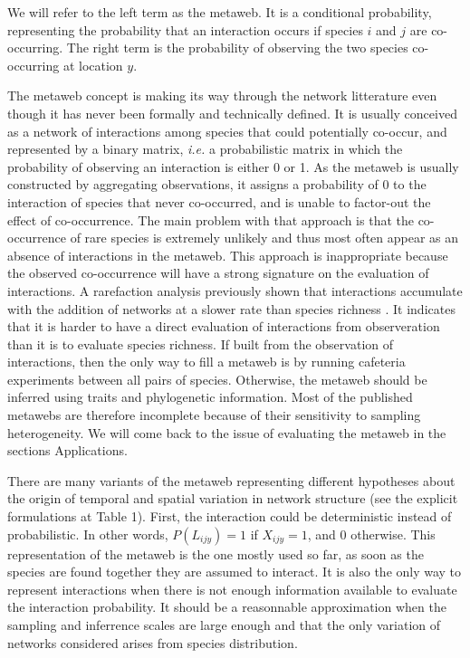 \documentclass[12pt]{article}
\begin{document}
We will refer to the left term as the metaweb. It is a conditional probability,
representing the probability that an interaction occurs if species $i$ and $j$
are co-occurring. The right term is the probability of observing the two species
co-occurring at location $y$.


The metaweb concept is making its way through the network litterature even
though it has never been formally and technically defined.
It is usually conceived as a network of interactions among species
that could potentially co-occur, and represented by a binary matrix,
\emph{i.e.} a probabilistic matrix in which the probability of observing
an interaction is either 0 or 1. As the metaweb is usually constructed by
aggregating observations, it assigns a probability of 0 to the interaction
of species that never co-occurred, and is unable to factor-out the effect of
co-occurrence. The main problem with that approach is that the co-occurrence
of rare species is extremely unlikely and thus most often appear as an absence
of interactions in the metaweb. This approach is inappropriate because the
observed co-occurrence will have a strong signature on the evaluation of
interactions. A rarefaction analysis previously shown that interactions
accumulate with the addition of networks at a slower rate than species
richness \parencite{Poisot2012d}. It indicates that it is harder to have a
direct evaluation of interactions from observeration than it is to evaluate
species richness. If built from the observation of interactions, then the
only way to fill a metaweb is by running cafeteria experiments between all
pairs of species. Otherwise, the metaweb should be inferred using traits
and phylogenetic information. Most of the published metawebs are therefore
incomplete because of their sensitivity to sampling heterogeneity. We will
come back to the issue of evaluating the metaweb in the sections Applications.

There are many variants of the metaweb representing different hypotheses about
the origin of temporal and spatial variation in network structure (see the
explicit formulations at Table 1). First, the interaction could be 
deterministic instead of probabilistic. In other words, $P(L_{ijy}) = 1$ if
$X_{ijy} = 1$, and 0 otherwise. This representation of the metaweb is the one
mostly used so far, as soon as the species are found together they are assumed
to interact. It is also the only way to represent interactions when there is not
enough information available to evaluate the interaction probability. It should be a
reasonnable approximation when the sampling and inferrence scales are large
enough and that the only variation of networks considered arises from species
distribution. 
\end{document}
